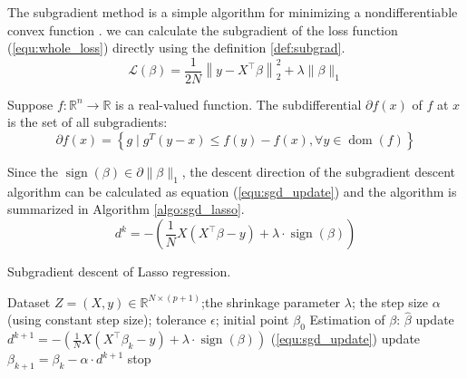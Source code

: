 \documentclass[11pt,en,authoryear]{elegantpaper}
\numberwithin{equation}{section}
\newcommand{\mbR}{\mathbb{R}}
\begin{document}
The subgradient method is a simple algorithm for minimizing a nondifferentiable convex function \citep{boyd2003subgradient}. we can calculate the subgradient of the loss function (\ref{equ:whole_loss}) directly using the definition \ref{def:subgrad}.
\begin{equation}\label{equ:whole_loss}
    \mathcal{L}(\beta) = \frac{1}{2N} \left\|y - X^{\top}\beta \right\|_2^2 + \lambda \|\beta \|_1
\end{equation}

\begin{definition}\label{def:subgrad}
Suppose $f: \mbR^{n}\rightarrow \mbR$ is a real-valued function. The subdifferential $\partial f(x)$ of $f$ at $x$ is the set of all subgradients:
\begin{equation}
    \partial f(x)=\left\{g \mid g^{T}(y-x) \leq f(y)-f(x), \forall y \in \operatorname{dom}(f)\right\}
\end{equation}
\end{definition}
Since the $\operatorname{sign}(\beta) \in \partial \|\beta \|_1$, the descent direction of the subgradient descent algorithm can be calculated as equation (\ref{equ:sgd_update}) and the algorithm is summarized in Algorithm \ref{algo:sgd_lasso}.
\begin{equation}\label{equ:sgd_update}
    d^{k}=-\left(\frac{1}{N}X(X^{\top}\beta-y)+\lambda \cdot \operatorname{sign}(\beta)\right)
\end{equation}

\begin{center}
\begin{minipage}{13.5cm}
	  \begin{algorithm}[H]
  \caption{Subgradient descent of Lasso regression.}\label{algo:sgd_lasso}
  \begin{algorithmic}[1]
    \Require
      Dataset $Z = (X, y) \in \mbR^{N \times (p+1)}$;the shrinkage parameter $\lambda$;  the step size $\alpha$ (using constant step size); tolerance $\epsilon$; initial point $\beta_0$
    \Ensure Estimation of $\beta$: $\hat{\beta}$
    {
    \State update $d^{k+1} = -\left(\frac{1}{N}X(X^{\top}\beta_k-y)+\lambda \cdot \operatorname{sign}(\beta)\right)$ \quad (\ref{equ:sgd_update})
    \State update $\beta_{k+1}= \beta_k - \alpha \cdot d^{k+1}$
    \State stop
    \EndIf
    }
    \EndFor
  \end{algorithmic}
\end{algorithm}
\end{minipage}
\end{center}
\end{document}
